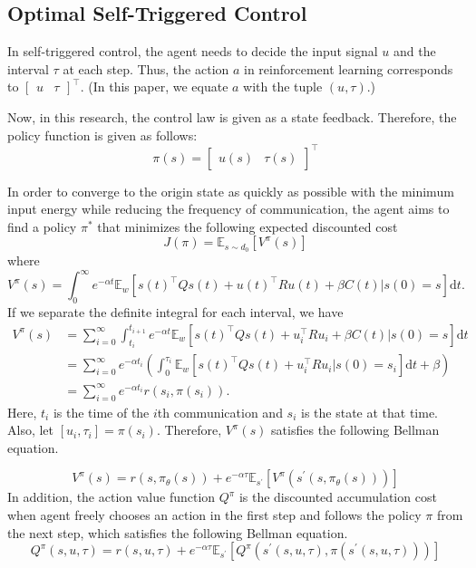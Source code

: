 \documentclass[english, dvipdfmx]{ampmt}             %
\newcommand{\expect}{\mathbb{E}}
\begin{document}
\subsection{Optimal Self-Triggered Control}
In self-triggered control, the agent needs to decide the input signal $u$ and the interval $\tau$ at each step. Thus, the action $a$ in reinforcement learning corresponds to $\begin{bmatrix}u & \tau \end{bmatrix}^{\top}$. (In this paper, we equate $a$ with the tuple $(u,\tau)$.) \par
Now, in this research, the control law is given as a state feedback. Therefore, the policy function is given as follows:
\begin{equation}
	\pi(s) = \begin{bmatrix}u(s) & \tau(s)\end{bmatrix}^{\top}
\end{equation}\par
In order to converge to the origin state as quickly as possible with the minimum input energy while reducing the frequency of communication, the agent aims to find a policy $\pi^{*}$ that minimizes the following expected discounted cost 
\begin{equation}
	J(\pi)=\expect_{s\sim d_0}[V^{\pi}(s)] \label{evalutaion}
\end{equation}
where
\begin{equation}
	V^{\pi}(s) = \int_{0}^{\infty} e^{-\alpha t}\expect_{w}[s(t)^{\top}Qs(t)+u(t)^{\top}Ru(t)+\beta C(t)|s(0)=s]\textrm{d}t.
\end{equation}
If we separate the definite integral for each interval, we have 
\begin{align}
	V^{\pi}(s) &= \sum_{i=0}^{\infty}\int_{t_i}^{t_{i+1}} e^{-\alpha t}\expect_{w}[s(t)^{\top}Qs(t)+u_i^{\top}Ru_i+\beta C(t)|s(0)=s]\textrm{d}t \nonumber \\
			 &= \sum_{i=0}^{\infty} e^{-\alpha t_i} (\int_{0}^{\tau_i}\expect_{w}[s(t)^{\top}Qs(t)+u_i^{\top}Ru_i|s(0)=s_i]\textrm{d}t + \beta) \nonumber \\
			 &= \sum_{i=0}^{\infty} e^{-\alpha t_i} r(s_i, \pi(s_i)) \label{self_acc_reward}.
\end{align}
Here, $t_i$ is the time of the $i$th communication and $s_i$ is the state at that time. Also, let $[u_i, \tau_i]=\pi(s_i)$. Therefore, $V^{\pi}(s)$ satisfies the following Bellman equation. \par
\begin{equation}
	V^{\pi}(s) = r(s,\pi_{\theta}(s)) + e^{-\alpha\tau}\expect_{s^{\prime}}[V^{\pi}(s^{\prime}(s,\pi_{\theta}(s)))] \label{bellman}
\end{equation}
In addition, the action value function $Q^{\pi}$ is the discounted accumulation cost when agent freely chooses an action in the first step and follows the policy $\pi$ from the next step, which satisfies the following Bellman equation.
\begin{equation}
	Q^{\pi}(s,u,\tau) = r(s,u,\tau) + e^{-\alpha\tau}\expect_{s^{\prime}}[Q^{\pi}(s^{\prime}(s,u,\tau), \pi(s^{\prime}(s,u,\tau)))] \label{Q_bellman}
\end{equation}
\end{document}
